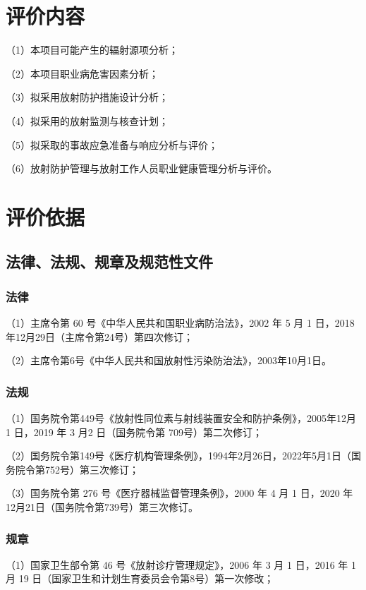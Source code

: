 \section{评价内容}

（1）本项目可能产生的辐射源项分析；

（2）本项目职业病危害因素分析；

（3）拟采用放射防护措施设计分析；

（4）拟采用的放射监测与核查计划；

（5）拟采取的事故应急准备与响应分析与评价；

（6）放射防护管理与放射工作人员职业健康管理分析与评价。

\section{评价依据}

\subsection{法律、法规、规章及规范性文件}

\subsubsection{法律}

（1）主席令第 60 号《中华人民共和国职业病防治法》，2002 年 5 月 1 日，2018年12月29日（主席令第24号）第四次修订；

（2）主席令第6号《中华人民共和国放射性污染防治法》，2003年10月1日。

\subsubsection{法规}

（1）国务院令第449号《放射性同位素与射线装置安全和防护条例》，2005年12月 1 日，2019 年 3 月2 日（国务院令第 709号）第二次修订；

（2）国务院令第149号《医疗机构管理条例》，1994年2月26日，2022年5月1日（国务院令第752号）第三次修订；

（3）国务院令第 276 号《医疗器械监督管理条例》，2000 年 4 月 1 日，2020 年12月21日（国务院令第739号）第三次修订。

\subsubsection{规章}

（1）国家卫生部令第 46 号《放射诊疗管理规定》，2006 年 3 月 1 日，2016 年 1月 19 日（国家卫生和计划生育委员会令第8号）第一次修改；


